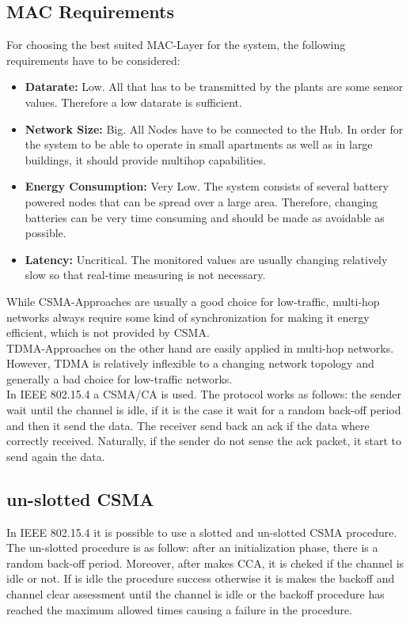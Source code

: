 
\subsection{MAC Requirements}
For choosing the best suited MAC-Layer for the system, the following requirements have to be considered:

\begin{itemize}
	\item \textbf{Datarate:}
	Low. All that has to be transmitted by the plants are some sensor values. Therefore a low datarate is sufficient.
	\item \textbf{Network Size:}
	Big. All Nodes have to be connected to the Hub. In order for the system to be able to operate in small apartments as well as in large buildings, it should provide multihop capabilities.
	\item \textbf{Energy Consumption:}
	Very Low. The system consists of several battery powered nodes that can be spread over a large area. Therefore, changing batteries can be very time consuming and should be made as avoidable as possible.
	\item \textbf{Latency:}
	Uncritical. The monitored values are usually changing relatively slow so that real-time measuring is not necessary.
\end{itemize}

While CSMA-Approaches are usually a good choice for low-traffic, multi-hop networks always require some kind of synchronization for making it energy efficient, which is not provided by CSMA.\\
TDMA-Approaches on the other hand are easily applied in multi-hop networks. However, TDMA is relatively inflexible to a changing network topology and generally a bad choice for low-traffic networks.\\
In IEEE 802.15.4 a CSMA/CA is used. The protocol works as follows:
the sender wait until the channel is idle, if it is the case it wait for a random back-off period and then it send the data. The receiver send back an ack if the data where correctly received. Naturally, if the sender do not sense the ack packet, it start to send again the data.\cite{slide}\\

\subsection{un-slotted CSMA}
In IEEE 802.15.4 it is possible to use a slotted and un-slotted CSMA procedure. The un-slotted procedure is as follow: after an initialization phase, there is a random back-off period. Moreover, after makes CCA, it is cheked if the channel is idle or not. If is idle the procedure success otherwise it is makes the backoff and channel clear assessment until the channel is idle or the backoff procedure has reached the maximum allowed times causing a failure in the procedure.\cite{slide}\\


